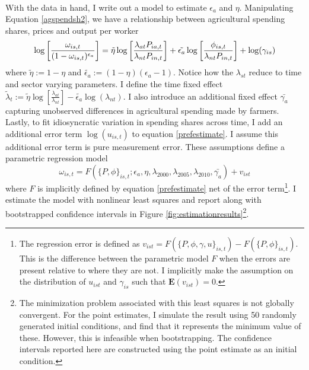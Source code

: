 \documentclass[]{article}
\theoremstyle{plain}
\begin{document}
\paragraph*{}
With the data in hand, I write out a model to estimate $\epsilon_{a}$ and $\eta$. Manipulating Equation \eqref{agspendsh2}, we have a relationship between agricultural spending shares, prices and output per worker
\begin{equation}\label{prefestimate}
	\small
		\log\bigg[\frac{\omega_{is,t}}{(1-\omega_{is,t})^{\epsilon_{a}}}\bigg] =  \tilde{\eta}\log\bigg[\frac{\lambda_{at}P_{ia,t}}{\lambda_{nt}P_{in, t}}\bigg] + \tilde{\epsilon_{a}}\log\bigg[\frac{\phi_{is, t}}{\lambda_{nt}P_{in, t}}\bigg] + \log(\gamma_{is})
\end{equation}
where $\tilde{\eta} := 1-\eta$ and $\tilde{\epsilon_{a}} := (1-\eta)(\epsilon_{a} - 1)$. Notice how the $\lambda_{st}$ reduce to time and sector varying parameters. I define the time fixed effect $\tilde{\lambda}_{t} := \tilde{\eta}\log[\frac{\lambda_{at}}{\lambda_{nt}}] - \tilde{\epsilon_{a}}\log(\lambda_{nt})$. I also introduce an additional fixed effect $\bar{\gamma_{a}}$ capturing unobserved differences in agricultural spending made by farmers. Lastly, to fit idiosyncratic variation in spending shares across time, I add an additional error term $\log(u_{is,t})$ to equation \eqref{prefestimate}. I assume this additional error term is pure measurement error. These assumptions define a parametric regression model
\begin{equation}\label{model1}
		\omega_{is,t} = F(\{P, \phi\}_{is,t} ; \epsilon_{a}, \eta, \lambda_{2000}, \lambda_{2005}, \lambda_{2010}, \bar{\gamma_{a}}) + v_{ist}
\end{equation} 
where $F$ is implicitly defined by equation \eqref{prefestimate} net of the error term\footnote{The regression error is defined as $v_{ist} =  F(\{P, \phi, \gamma,u\}_{is,t}) - F(\{P, \phi\}_{is,t})$. This is the difference between the parametric model $F$ when the errors are present relative to where they are not. I implicitly make the assumption on the distribution of $u_{ist}$ and $\gamma_{is}$ such that $\mathbf{E}(v_{ist}) = 0$.}. I estimate the model with nonlinear least squares and report along with bootstrapped confidence intervals in  Figure \ref{fig:estimationresults}\footnote{The minimization problem associated with this least squares is not globally convergent. For the point estimates, I simulate the result using 50 randomly generated initial conditions, and find that it represents the minimum value of these. However, this is infeasible when bootstrapping. The confidence intervals reported here are constructed using the point estimate as an initial condition.}.
\end{document}
